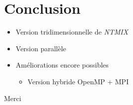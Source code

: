 \documentclass{beamer}
\begin{document}
%
%
\section{Conclusion}
\begin{frame}
  \begin{itemize}
  \item Version tridimensionnelle de \textit{NTMIX}
  \item Version parallèle
  \item Améliorations encore possibles
    \begin{itemize}
    \item Version hybride OpenMP + MPI
    \end{itemize}
  \end{itemize}

\end{frame}

\begin{frame}
  \centering Merci
  
\end{frame}
\end{document}
